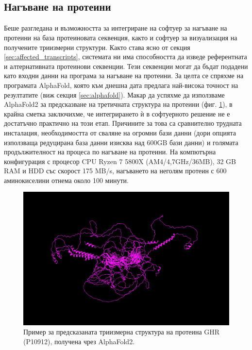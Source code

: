 \documentclass[pdftex,cyrillic,14pt,a4page,twoside,openright]{extreport}
\begin{document}
\subsection{Нагъване на протеини}
\paragraph{}
Беше разгледана и възможността за интегриране на софтуер за нагъване на протеини на база протеиновата секвенция, както и софтуер за визуализация на получените триизмерни структури. Както става ясно от секция \ref{sec:affected_transcripts}, системата ни има способността да изведе референтната и алтернативната протеинови секвенции. Тези секвенции могат да бъдат подадени като входни данни на програма за нагъване на протеини. За целта се спряхме на програмата AlphaFold, която към днешна дата предлага най-висока точност на резултатите (виж секция \ref{sec:alphafold}). Макар да успяхме да използваме AlphaFold2 за предсказване на третичната структура на протеини (фиг. \ref{fig:folded_protein}), в крайна сметка заключихме, че интегрирането ѝ в софтуерното решение не е достатъчно практично на този етап. Причините за това са сравнително трудната инсталация, необходимостта от сваляне на огромни бази данни (дори опцията използваща редуцирана база данни изисква над 600GB бази данни) и голямата продължителност на процеса по нагъване на протеини. На компютърна конфигурация с процесор CPU Ryzen 7 5800X (AM4/4,7GHz/36MB), 32 GB RAM и HDD със скорост 175 MB/s, нагъването на неголям протеин с 600 аминокиселини отнема около 100 минути.

\begin{figure}[h]
  \centering
  \includegraphics[width=16cm]{figures/folded_protein}
  \caption {Пример за предсказаната триизмерна структура на протеина GHR (P10912), получена чрез AlphaFold2.}
  \label{fig:folded_protein}
\end{figure}
\end{document}
